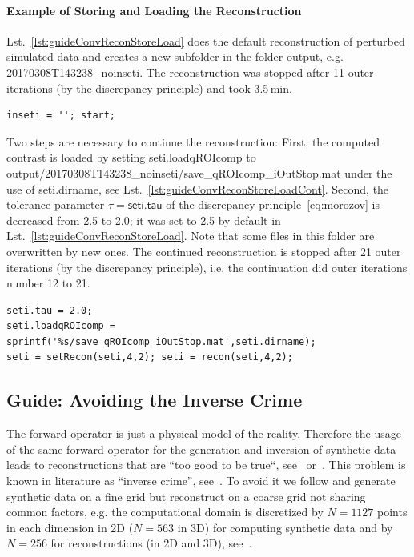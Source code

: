 \documentclass[a4paper]{article}
\begin{document}
\paragraph{Example of Storing and Loading the Reconstruction} Lst.~\ref{lst:guideConvReconStoreLoad} does the default reconstruction of perturbed simulated data and creates a new subfolder in the folder \textsf{output}, e.g. \textsf{20170308T143238\_noinseti}. The reconstruction was stopped after 11 outer iterations (by the discrepancy principle) and took 3.5\,min.

\begin{lstlisting}[caption={A reconstruction process to be continued.},label=lst:guideConvReconStoreLoad]
inseti = ''; start;
\end{lstlisting}

Two steps are necessary to continue the reconstruction: First, the computed contrast is loaded by setting \textsf{seti.loadqROIcomp} to \textsf{output/\allowbreak 20170308T143238\_noinseti/\allowbreak save\_qROIcomp\_iOutStop.mat} under the use of \textsf{seti.dirname}, see Lst.~\ref{lst:guideConvReconStoreLoadCont}. Second, the tolerance parameter $\tau = \textsf{seti.tau}$ of the discrepancy principle~\eqref{eq:morozov} is decreased from 2.5 to 2.0; it was set to 2.5 by default in Lst.~\ref{lst:guideConvReconStoreLoad}. Note that some files in this folder are overwritten by new ones. The continued reconstruction is stopped after 21 outer iterations (by the discrepancy principle), i.e. the continuation did outer iterations number 12 to 21.

\begin{lstlisting}[caption={The continuation of Lst.~\ref{lst:guideConvReconStoreLoad} (\emph{source code}: \textsf{guides/guideConvReconStoreLoadCont.m}).},label=lst:guideConvReconStoreLoadCont]
seti.tau = 2.0;
seti.loadqROIcomp = sprintf('%s/save_qROIcomp_iOutStop.mat',seti.dirname);
seti = setRecon(seti,4,2); seti = recon(seti,4,2);
\end{lstlisting}


\subsection{Guide: Avoiding the Inverse Crime}\label{sec:guide:invCrime}

The forward operator is just a physical model of the reality. Therefore the usage of the same forward operator for the generation and inversion of synthetic data leads to reconstructions that are ``too good to be true``, see~\cite{Kaipio2005} or~\cite{Mueller2012}. This problem is known in literature as ``inverse crime'', see~\cite{Colton2013}. 
%
To avoid it we follow \cite[Ch.~2.3.6]{Mueller2012} and generate synthetic data on a fine grid but reconstruct on a coarse grid not sharing common factors, e.g. the computational domain is discretized by $N = 1127$ points in each dimension in 2D ($N = 563$ in 3D) for computing synthetic data and by $N = 256$ for reconstructions (in 2D and 3D), see~\cite[Sec.~5]{Buergel2017}.
\end{document}

